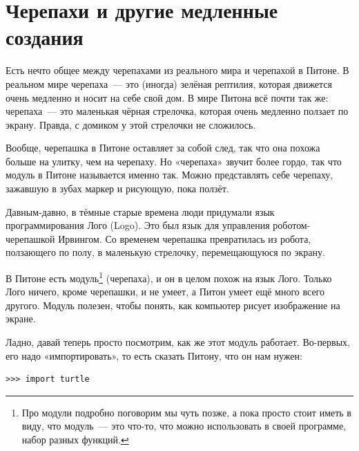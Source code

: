 
\chapter{Черепахи и другие медленные создания}\label{ch:turtles}

Есть нечто общее между черепахами из реального мира и черепахой в Питоне. В реальном мире черепаха — это (иногда) зелёная рептилия, которая движется очень медленно и носит на себе свой дом. В мире Питона всё почти так же: черепаха — это маленькая чёрная стрелочка, которая очень медленно ползает по экрану. Правда, с домиком у этой стрелочки не сложилось.

Вообще, черепашка в Питоне оставляет за собой след, так что она похожа больше на улитку, чем на черепаху. Но «черепаха» звучит более гордо, так что модуль в Питоне называется именно так. Можно представлять себе черепаху, зажавшую в зубах маркер и рисующую, пока ползёт.

Давным-давно, в тёмные старые времена люди придумали язык программирования Лого (Logo). Это был язык для управления роботом-черепашкой Ирвингом. Со временем черепашка превратилась из робота, ползающего по полу, в маленькую стрелочку, перемещающуюся по экрану.


В Питоне есть модуль\footnote{Про модули подробно поговорим мы чуть позже, а пока просто стоит иметь в виду, что модуль — это что-то, что можно использовать в своей программе, набор разных функций.}  (черепаха), и он в целом похож на язык Лого. Только Лого ничего, кроме черепашки, и не умеет, а Питон умеет ещё много всего другого. Модуль  полезен, чтобы понять, как компьютер рисует изображение на экране.

Ладно, давай теперь просто посмотрим, как же этот модуль работает. Во-первых, его надо «импортировать», то есть сказать Питону, что он нам нужен:

\begin{listing}
\begin{verbatim}
>>> import turtle
\end{verbatim}
\end{listing}

